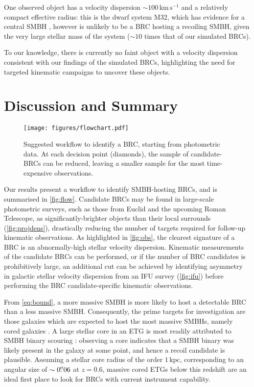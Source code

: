 \documentclass[twocolumn]{aastex631}
\newcommand{\kmps}{\ensuremath{\mathrm{km}\,\mathrm{s}^{-1}} }%
\begin{document}
One observed object has a velocity dispersion $\sim 100\,\kmps$ and a relatively compact effective radius: this is the dwarf system M32, which has evidence for a central SMBH \citep{vandermarel1997,mcconnachie2012}, however is unlikely to be a BRC hosting a recoiling SMBH, given the very large stellar mass of the system ($\sim10$ times that of our simulated BRCs).

To our knowledge, there is currently no faint object with a velocity dispersion consistent with our findings of the simulated BRCs, highlighting the need for targeted kinematic campaigns to uncover these objects.

\section{Discussion and Summary} \label{sec:discussion}
\begin{figure}[t]
    \centering
    \texttt{[image: figures/flowchart.pdf]}
    \caption{
        Suggested workflow to identify a BRC, starting from photometric data. 
        At each decision point (diamonds), the sample of candidate-BRCs can be reduced, leaving a smaller sample for the most time-expensive observations.
    }
    \label{fig:flow}
\end{figure}
Our results present a workflow to identify SMBH-hosting BRCs, and is summarised in \autoref{fig:flow}.
Candidate BRCs may be found in large-scale photometric surveys, such as those from Euclid and the upcoming Roman Telescope, as significantly-brighter objects than their local surrounds (\autoref{fig:projdens}), drastically reducing the number of targets required for follow-up kinematic observations.
As highlighted in \autoref{fig:obs}, the clearest signature of a BRC is an abnormally-high stellar velocity dispersion.
Kinematic measurements of the candidate BRCs can be performed, or if the number of BRC candidates is prohibitively large, an additional cut can be achieved by identifying asymmetry in galactic stellar velocity dispersion from an IFU survey (\autoref{fig:ifu}) before performing the BRC candidate-specific kinematic observations.

From \autoref{eq:bound}, a more massive SMBH is more likely to host a detectable BRC than a less massive SMBH.
Consequently, the prime targets for investigation are those galaxies which are expected to host the most massive SMBHs, namely cored galaxies \citep[e.g.][]{thomas2016}.
A large stellar core in an ETG is most readily attributed to SMBH binary scouring \citep[e.g.][]{Thomas2014}: observing a core indicates that a SMBH binary was likely present in the galaxy at some point, and hence a recoil candidate is plausible.
Assuming a stellar core radius of the order $1\,\mathrm{kpc}$, corresponding to an angular size of $\sim0\mbox{$.\!\!^{\prime\prime}$}06$ at $z=0.6$, massive cored ETGs below this redshift are an ideal first place to look for BRCs with current instrument capability.
\end{document}
